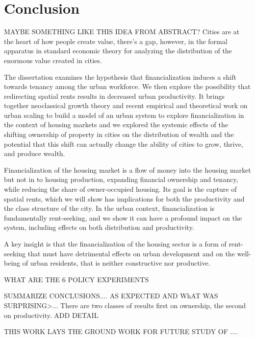 \chapter{Conclusion} \label{chapter-conclusions}

MAYBE SOMETHING LIKE THIS IDEA FROM ABSTRACT? Cities are at the heart of how people create value, there's a gap, however, in the formal apparatus in standard economic theory for analyzing the distribution of the enormous value created in cities.


The dissertation examines the hypothesis that financialization induces a shift towards tenancy among the urban workforce. We then explore the possibility that redirecting spatial rents results in decreased urban productivity. 
It brings together \gls{neoclassical growth theory} and recent empirical and theoretical work on \gls{urban scaling} to build a model of an urban system to explore financialization in the context of housing markets and we explored the systemic effects of the shifting ownership of property in cities on the distribution of wealth and the potential that this shift can actually change the ability of cities to grow, thrive, and produce wealth.


Financialization of the housing market is a flow of money into the housing market but not in to housing production, expanding financial ownership and tenancy, while reducing the share of owner-occupied housing. Its goal is the capture of spatial rents, which we will show has implications for both the productivity and the class structure of the city. 
In the urban context, financialization is fundamentally \gls{rent-seeking}, and we show it can have a profound impact on the system, including effects on both distribution and productivity. 

A key insight is that the financialization of the housing sector is a form of \gls{rent-seeking} that must have detrimental effects on urban development and on the well-being of urban residents, that is neither constructive nor productive.

WHAT ARE THE 6 POLICY EXPERIMENTS

SUMMARIZE CONCLUSIONS.... AS EXPECTED AND WhAT WAS SURPRISING>...
There are two classes of results first on ownership, the second on productivity. ADD DETAIL

THIS WORK LAYS THE GROUND WORK FOR FUTURE STUDY OF ....

